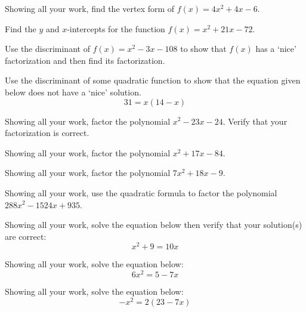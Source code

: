 \documentclass[12pt,letterpaper]{exam}
\begin{document}
\begin{questions}
\newpage
\question[10] Showing all your work, find the vertex form of $f(x)= 4x^2 + 4x - 6$. 



\newpage
\question[10] Find the $y$ and $x$-intercepts for the function $f(x)= x^2 + 21x - 72$. 



\newpage
\question[10] Use the discriminant of $f(x)= x^2 - 3x - 108$ to show that $f(x)$ has a `nice' factorization and then find its factorization. 



\newpage
\question[10] Use the discriminant of some quadratic function to show that the equation given below does not have a `nice' solution.
	\[
	31= x(14 - x)
	\]



\newpage
\question[10] Showing all your work, factor the polynomial $x^2 - 23x - 24$. Verify that your factorization is correct. 



\newpage
\question[10] Showing all your work, factor the polynomial $x^2 + 17x - 84$. 



\newpage
\question[10] Showing all your work, factor the polynomial $7x^2 + 18x - 9$. 



\newpage
\question[10] Showing all your work, use the quadratic formula to factor the polynomial $288x^2 - 1524x + 935$. 



\newpage
\question[10] Showing all your work, solve the equation below then verify that your solution(s) are correct:
	\[
	x^2 + 9= 10x
	\]



\newpage
\question[10] Showing all your work, solve the equation below:
	\[
	6x^2= 5 - 7x
	\]



\newpage
\question[10] Showing all your work, solve the equation below:
	\[
	-x^2= 2(23 - 7x)
	\]


\end{questions}
\end{document}
